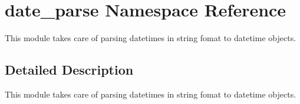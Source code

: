 \hypertarget{namespacedate__parse}{}\section{date\+\_\+parse Namespace Reference}
\label{namespacedate__parse}


This module takes care of parsing datetimes in string fomat to datetime objects.  




\subsection{Detailed Description}
This module takes care of parsing datetimes in string fomat to datetime objects. 